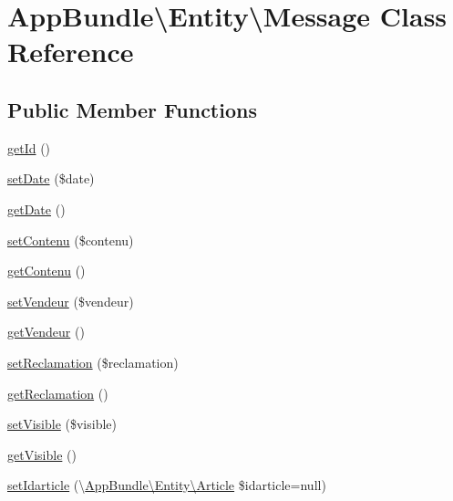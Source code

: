 \hypertarget{class_app_bundle_1_1_entity_1_1_message}{}\section{App\+Bundle\textbackslash{}Entity\textbackslash{}Message Class Reference}
\label{class_app_bundle_1_1_entity_1_1_message}
\subsection*{Public Member Functions}
\begin{DoxyCompactItemize}
\item 
\hyperlink{class_app_bundle_1_1_entity_1_1_message_ae0f01ee025924df768be0e174abb2537}{get\+Id} ()
\item 
\hyperlink{class_app_bundle_1_1_entity_1_1_message_acced6776fe065b9ece2a39090b38b20d}{set\+Date} (\$date)
\item 
\hyperlink{class_app_bundle_1_1_entity_1_1_message_a74cdf9f9933ea0b7cc938d71d57b3d6f}{get\+Date} ()
\item 
\hyperlink{class_app_bundle_1_1_entity_1_1_message_ae47b510faa7817c7551102cdbff5f60a}{set\+Contenu} (\$contenu)
\item 
\hyperlink{class_app_bundle_1_1_entity_1_1_message_abdc72ee4fb6c0f312738397880202355}{get\+Contenu} ()
\item 
\hyperlink{class_app_bundle_1_1_entity_1_1_message_a4ec8ec430673bd2b7371f59de1b4b513}{set\+Vendeur} (\$vendeur)
\item 
\hyperlink{class_app_bundle_1_1_entity_1_1_message_a8be0d801bcf5cfe72af9a1c34c3dea73}{get\+Vendeur} ()
\item 
\hyperlink{class_app_bundle_1_1_entity_1_1_message_a3677de6fea7ce51a611e4703d8869e26}{set\+Reclamation} (\$reclamation)
\item 
\hyperlink{class_app_bundle_1_1_entity_1_1_message_aeec4553166c7f71a50c99220eb94bba7}{get\+Reclamation} ()
\item 
\hyperlink{class_app_bundle_1_1_entity_1_1_message_afc326f8db6bbe6b45f4b6081ad76fbd8}{set\+Visible} (\$visible)
\item 
\hyperlink{class_app_bundle_1_1_entity_1_1_message_a05634c696e939b4a785c0e25d1896602}{get\+Visible} ()
\item 
\hyperlink{class_app_bundle_1_1_entity_1_1_message_ac74cd3520230e3ef8f70d668d0d7a4fc}{set\+Idarticle} (\textbackslash{}\hyperlink{class_app_bundle_1_1_entity_1_1_article}{App\+Bundle\textbackslash{}\+Entity\textbackslash{}\+Article} \$idarticle=null)

\end{DoxyCompactItemize}
